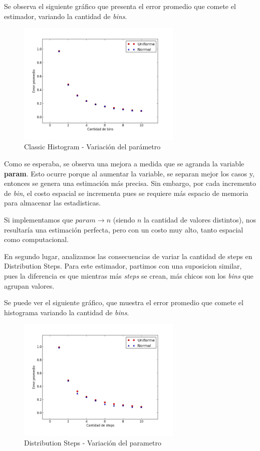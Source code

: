 \documentclass[10pt, a4paper,english,spanish,hidelinks]{article}
\begin{document}
Se observa el siguiente gráfico que presenta el error promedio que comete el estimador, variando
la cantidad de \textit{bins}.

\begin{figure}
  \centering
  \includegraphics[width=0.7\textwidth]{./imagenes/ejb2_classic_parameter_variation.png}
  \caption{Classic Histogram - Variación del parámetro}
\end{figure}

\newpage
Como se esperaba, se observa una mejora a medida que se agranda la variable \textbf{param}.
Esto ocurre porque al aumentar la variable, se separan mejor los casos y, entonces se genera una estimación más precisa.
Sin embargo, por cada incremento de \textit{bin}, el costo espacial se incrementa pues se requiere
más espacio de memoria para almacenar las estadisticas.

Si implementamos que $param \rightarrow n$ (siendo $n$ la cantidad de valores distintos), nos
resultaría una estimación perfecta, pero con un costo muy alto, tanto espacial como computacional.

En segundo lugar, analizamos las consecuencias de variar la cantidad de steps en Distribution Steps. Para este estimador, partimos con una suposicion similar, pues la diferencia es que mientras
más \textit{steps} se crean, más chicos son los \textit{bins} que agrupan valores.


Se puede ver el siguiente gráfico, que muestra el error promedio que comete el histograma variando
la cantidad de \textit{bins}.

\newpage
\begin{figure}
  \centering
  \includegraphics[width=0.7\textwidth]{./imagenes/ejb2_step_parameter_variation.png}
  \caption{Distribution Steps - Variación del parametro}
\end{figure}
\end{document}
